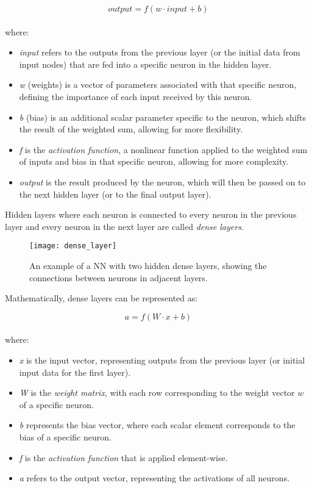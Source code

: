 \[
\textit{output} = f(w \cdot \textit{input} + b)
\]
\\
\noindent where:

\begin{itemize}
  \item \textit{input} refers to the outputs from the previous layer (or the initial data from input nodes) that are fed into a specific neuron in the hidden layer.
  \item \textit{w} (weights) is a vector of parameters associated with that specific neuron, defining the importance of each input received by this neuron. 
  \item \textit{b} (bias) is an additional scalar parameter specific to the neuron, which shifts the result of the weighted sum, allowing for more flexibility.
  \item \textit{f} is the \textit{activation function}, a nonlinear function applied to the weighted sum of inputs and bias in that specific neuron, allowing for more complexity.
  \item \textit{output} is the result produced by the neuron, which will then be passed on to the next hidden layer (or to the final output layer).
\end{itemize}

\noindent Hidden layers where each neuron is connected to every neuron in the previous layer 
and every neuron in the next layer are called \textit{dense layers}.

\begin{figure}[h!]
  \centering
  \texttt{[image: dense\_layer]}
  \caption{An example of a NN with two hidden dense layers, showing the connections between neurons in adjacent layers.}
  \label{fig:dense_layer}
\end{figure}

\noindent Mathematically, dense layers can be represented as:

\[
\textit{a} = f(W \cdot \textit{x} + b)
\]
\\
\noindent where:
\begin{itemize}
  \item \textit{x} is the input vector, representing outputs from the previous layer (or initial input data for the first layer).
  \item \textit{W} is the \textit{weight matrix}, with each row corresponding to the weight vector \( w \) of a specific neuron.
  \item \textit{b} represents the bias vector, where each scalar element corresponds to the bias of a specific neuron.
  \item \textit{f} is the \textit{activation function} that is applied element-wise.
  \item \textit{a} refers to the output vector, representing the activations of all neurons.
\end{itemize}

